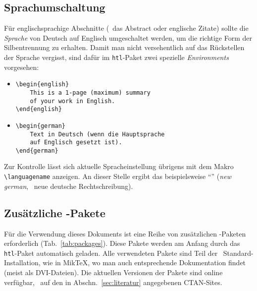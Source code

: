 \subsection{Sprachumschaltung}
\label{sec:sprachumschaltung}

Für englischsprachige Abschnitte (\zB\ das Abstract oder englische
Zitate) sollte die \emph{Sprache} von Deutsch auf Englisch
umgeschaltet werden, um die richtige Form der Silbentrennung zu
erhalten. Damit man nicht versehentlich auf das Rückstellen der
Sprache vergisst, sind dafür im \texttt{htl}-Paket zwei
spezielle \emph{Environments} vorgesehen:
%
\begin{itemize}
\item[] 
\verb!\begin{english}!\\
\verb!    This is a 1-page (maximum) summary!\\
\verb!    of your work in English.!\\
\verb!\end{english}!
\end{itemize}

\begin{itemize}
\item[] 
\verb!\begin{german}!\\
\verb!    Text in Deutsch (wenn die Hauptsprache!\\
\verb!    auf Englisch gesetzt ist).!\\
\verb!\end{german}!
\end{itemize}
%
Zur Kontrolle lässt sich aktuelle Spracheinstellung übrigens mit dem Makro \verb!\languagename!
anzeigen. An dieser Stelle ergibt das beispielsweise "`\texttt{\languagename}"' (\emph{new german}, \dah\ neue deutsche Rechtschreibung).


\subsection{Zusätzliche {\latex}-Pakete}

Für die Verwendung dieses Dokuments ist eine Reihe von
zusätzlichen \latex-Paketen erforderlich
(Tab.~\ref{tab:packages}). Diese Pakete werden am Anfang
durch das \texttt{htl}-Paket automatisch geladen. 
Alle verwendeten Pakete sind
Teil der \latex\ Standard-Installation, wie \zB in MikTeX, wo
man auch entsprechende Dokumentation findet (meist als DVI-Dateien).
Die aktuellen Versionen der Pakete sind online verfügbar, \ua\ auf den
in Abschn.~\ref{sec:literatur} angegebenen CTAN-Sites.

